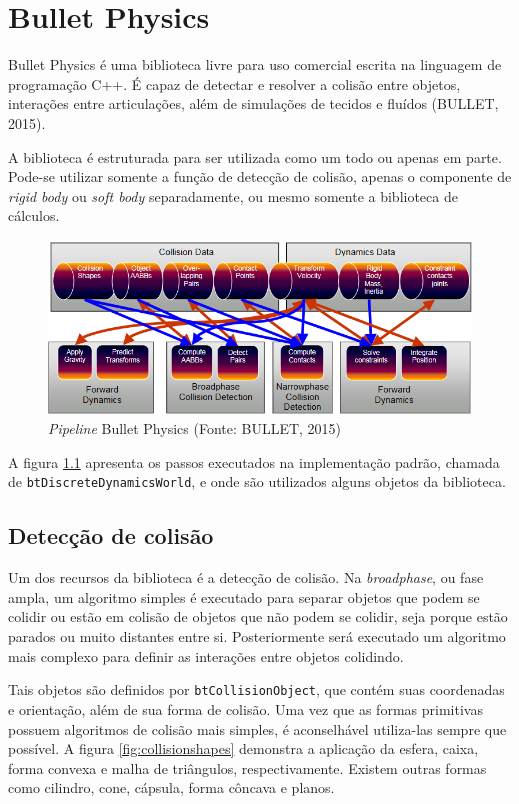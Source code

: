 \chapter{Bullet Physics}

Bullet Physics é uma biblioteca livre para uso comercial escrita na linguagem de programação C++. É capaz de detectar e resolver a colisão entre objetos, interações entre articulações, além de simulações de tecidos e fluídos (BULLET, 2015).

A biblioteca é estruturada para ser utilizada como um todo ou apenas em parte. Pode-se utilizar somente a função de detecção de colisão, apenas o componente de \textit{rigid body} ou \textit{soft body} separadamente, ou mesmo somente a biblioteca de cálculos.

\begin{figure}[H]
	\centering
	\includegraphics[scale=0.7]{imagens/bullet-pipeline.png}
	\caption{\small \textit{Pipeline} Bullet Physics (Fonte: BULLET, 2015)}
	\label{fig:bulletpipeline}
\end{figure}

A figura \ref{fig:bulletpipeline} apresenta os passos executados na implementação padrão, chamada de \lstinline{btDiscreteDynamicsWorld}, e onde são utilizados alguns objetos da biblioteca.

\section{Detecção de colisão}

Um dos recursos da biblioteca é a detecção de colisão. Na \textit{broadphase}, ou fase ampla, um algoritmo simples é executado para separar objetos que podem se colidir ou estão em colisão de objetos que não podem se colidir, seja porque estão parados ou muito distantes entre si. Posteriormente será executado um algoritmo mais complexo para definir as interações entre objetos colidindo.

Tais objetos são definidos por \lstinline{btCollisionObject}, que contém suas coordenadas e orientação, além de sua forma de colisão. Uma vez que as formas primitivas possuem algoritmos de colisão mais simples, é aconselhável utiliza-las sempre que possível. A figura \ref{fig:collisionshapes} demonstra a aplicação da esfera, caixa, forma convexa e malha de triângulos, respectivamente. Existem outras formas como cilindro, cone, cápsula, forma côncava e planos.

